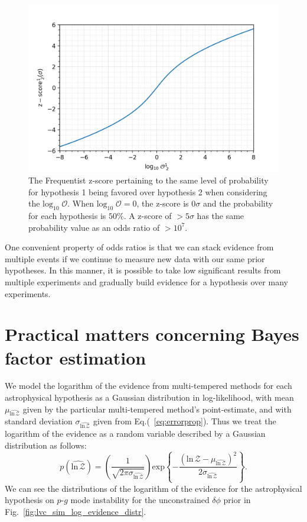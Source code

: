 \begin{figure}
  \includegraphics[width=\textwidth]{figs/chapter5/log10odds_z_score.png}
  \caption{The Frequentist z-score pertaining to the same level of probability for  hypothesis 1 being favored over hypothesis 2 when considering the $\mathrm{log}_{10} \; \mathcal{O}$. When $\mathrm{log}_{10} \; \mathcal{O} = 0$, the z-score is $0 \sigma$ and the probability for each hypothesis is $50\%$. A z-score of $>5 \sigma$ has the same probability value as an odds ratio of $> 10^7$.}
  \label{fig:log10odds_v_z_score}
\end{figure}

One convenient property of odds ratios is that we can stack evidence from multiple events if we continue to measure new data with our same prior hypotheses. In this manner, it is possible to take low significant results from multiple experiments and gradually build evidence for a hypothesis over many experiments.

\section{Practical matters concerning Bayes factor estimation}
We model the logarithm of the evidence from multi-tempered methods for each astrophysical hypothesis as a Gaussian distribution in log-likelihood, with mean $\mu_{\widehat{\mathrm{ln} \, \mathcal{Z}}}$ given by the particular multi-tempered method's point-estimate, and with standard deviation $\sigma_{\widehat{\mathrm{ln} \, \mathcal{Z}}}$ given from Eq.(~\ref{eq:errorprop}). Thus we treat the logarithm of the evidence as a random variable described by a Gaussian distribution as follows:
\begin{equation}\label{eqn:p_log_z}
    p(\widehat{\mathrm{ln} \, \mathcal{Z}}) = \left(\frac{1}{\sqrt{2 \pi \sigma_{\widehat{\mathrm{ln} \, \mathcal{Z}}}}} \right) \mathrm{exp} \left \{-\frac{\left(\mathrm{ln} \, \mathcal{Z} - \mu_{\widehat{\mathrm{ln} \, \mathcal{Z}}}\right)^2} {2 \sigma_{\widehat{\mathrm{ln} \, \mathcal{Z}}}}  \right\}.
\end{equation}
We can see the distributions of the logarithm of the evidence for the astrophysical hypothesis on $p$-$g$ mode instability for the unconstrained $\delta \phi$ prior in Fig.~\ref{fig:lvc_sim_log_evidence_distr}.

